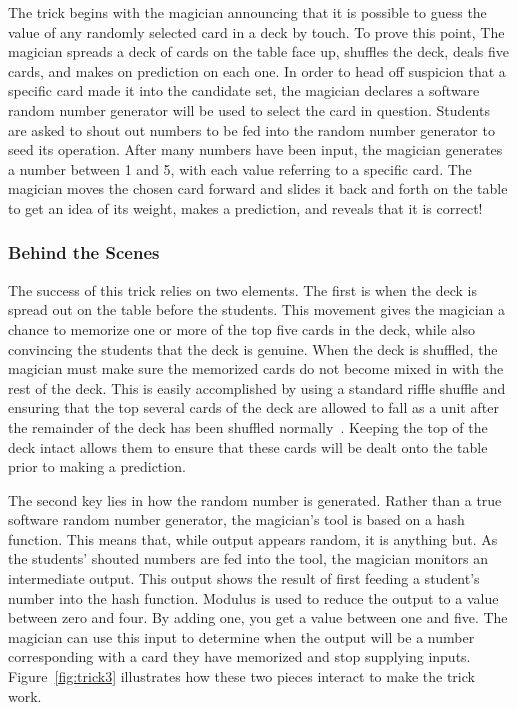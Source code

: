 The trick begins with the magician announcing that it is possible to
guess the value of any randomly selected card in a deck by touch. 
To prove this point,
The magician spreads a deck of cards on the table face up,
shuffles the deck,
deals five cards, 
and makes on prediction on each one.
In order to head off suspicion that a specific card made it into the candidate set, the magician declares
a software random number generator will be used to select the card in question. 
Students are asked to shout out numbers to be fed into the random number
generator to seed its operation.  After many numbers have been input, the
magician generates a number between 1 and 5, with each value referring to a
specific card.  The magician moves the chosen card forward and slides it back
and forth on the table to get an idea of its weight,  makes
a prediction, and reveals that it is correct!

\subsubsection{Behind the Scenes}


The success of this trick relies on two elements.
The first is when the deck is spread out on the
table before the students.  This movement gives the magician a chance to
memorize one or more of the top five cards in the deck, while also  convincing
the students that the deck is genuine.
When the deck is
shuffled, the magician must make sure the memorized cards do not
become mixed in with the rest of the deck.  This is easily accomplished by
using a standard riffle shuffle and ensuring that the top several cards of
the deck are allowed to fall as a unit after the remainder of the deck has
been shuffled normally~\cite{wikishuffle}.
Keeping the top of the deck intact allows them to ensure that
these cards will be dealt onto the table prior to making a prediction.


The second key lies in how the random number is generated.
Rather than
a true software random number generator, the magician's tool is based on a hash
function.  This means that, while output appears random, it is anything but.
As the students' shouted numbers are fed into the tool, the magician monitors an
intermediate output.
This output shows the result of first feeding a student's number
into the hash function. Modulus is used to reduce the output to a value
between zero and four. By adding one, you  get a value between
one and five.
The magician can use this input to determine when the output will be a number
corresponding with a card they have memorized and stop supplying inputs.
Figure~\ref{fig:trick3} illustrates how these two pieces interact to make
the trick work.


%



